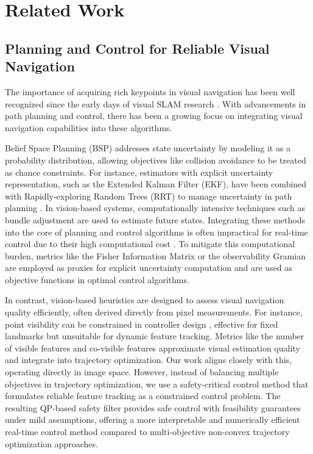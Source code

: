 \section{Related Work}
\subsection{Planning and Control for Reliable Visual Navigation}


The importance of acquiring rich keypoints in visual navigation has been well recognized since the early days of visual SLAM research \cite{davison2002simultaneous}. With advancements in path planning and control, there has been a growing focus on integrating visual navigation capabilities into these algorithms.


Belief Space Planning (BSP) addresses state uncertainty by modeling it as a probability distribution, allowing objectives like collision avoidance to be treated as chance constraints. For instance, estimators with explicit uncertainty representation, such as the Extended Kalman Filter (EKF), have been combined with Rapidly-exploring Random Trees (RRT) to manage uncertainty in path planning \cite{bry2011rapidly}. 
In vision-based systems, computationally intensive techniques such as bundle adjustment are used to estimate future states. Integrating these methods into the core of planning and control algorithms is often impractical for real-time control due to their high computational cost \cite{achtelik2014motion} \cite{indelman2015planning}. To mitigate this computational burden, metrics like the Fisher Information Matrix \cite{zhang2019beyond} or the observability Gramian \cite{hausman2017observability} are employed as proxies for explicit uncertainty computation and are used as objective functions in optimal control algorithms.


In contrast, vision-based heuristics are designed to assess visual navigation quality efficiently, often derived directly from pixel measurements. For instance, point visibility can be constrained in controller design \cite{falanga2018pampc} \cite{kim2023visibility}, effective for fixed landmarks but unsuitable for dynamic  feature tracking. Metrics like the number of visible features \cite{kim2021topology} and co-visible features \cite{chen2024apace} approximate visual estimation quality and integrate into trajectory optimization. Our work aligns closely with this, operating directly in image space. However, instead of balancing multiple objectives in trajectory optimization, we use a safety-critical control method that formulates reliable feature tracking as a constrained control problem.
The resulting QP-based safety filter provides safe control with feasibility guarantees under mild assumptions, offering a more interpretable and numerically efficient real-time control method compared to multi-objective non-convex trajectory optimization approaches.


